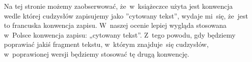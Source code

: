 \documentclass[a4paper,11pt]{article}
\begin{document}
 Na tej stronie możemy zaobserwować, że~w~książeczce użyta jest
konwencja wedle której cudzysłów zapisujemy jako ”cytowany tekst”, wydaje
mi~się, że~jest to francuska konwencja zapisu. W~naszej ocenie lepiej
wygląda stosowana w~Polsce konwencja zapisu: „cytowany tekst”. Z~tego
powodu, gdy będziemy poprawiać jakiś fragment tekstu, w~którym znajduje~się
cudzysłów, w~poprawionej wersji będziemy stosować tę drugą konwencję.

\vspace{\spaceFour}







































\newpage


\vspace{\spaceFive}
\end{document}
